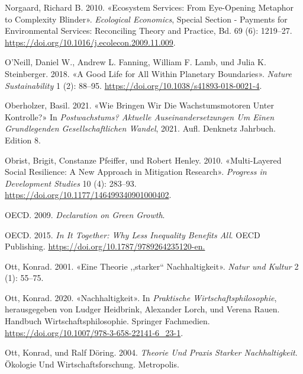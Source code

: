 \documentclass[
  nswissgerman,
  a4paper,
  DIV=11,
  numbers=noendperiod,
  oneside,
  openany]{scrreprt}
\newlength{\cslhangindent}
\newenvironment{CSLReferences}[2] %
 {\begin{list}{}{%
  \setlength{\itemindent}{0pt}
  \setlength{\leftmargin}{0pt}
  \setlength{\parsep}{0pt}
  \ifodd #1
   \setlength{\leftmargin}{\cslhangindent}
   \setlength{\itemindent}{-1\cslhangindent}
  \fi
  \setlength{\itemsep}{#2\baselineskip}}}
 {\end{list}}
\begin{document}
\begin{CSLReferences}{1}{1}
Norgaard, Richard B. 2010. {«Ecosystem Services: {From} Eye-Opening
Metaphor to Complexity Blinder»}. \emph{Ecological Economics}, Special
{Section} - {Payments} for {Environmental Services}: {Reconciling
Theory} and {Practice}, Bd. 69 (6): 1219--27.
\url{https://doi.org/10.1016/j.ecolecon.2009.11.009}.

O'Neill, Daniel W., Andrew L. Fanning, William F. Lamb, und Julia K.
Steinberger. 2018. {«A Good Life for All Within Planetary Boundaries»}.
\emph{Nature Sustainability} 1 (2): 88--95.
\url{https://doi.org/10.1038/s41893-018-0021-4}.

Oberholzer, Basil. 2021. {«Wie Bringen Wir Die {Wachstumsmotoren} Unter
{Kontrolle}?»} In \emph{Postwachstums? {Aktuelle Auseinandersetzungen}
Um Einen Grundlegenden Gesellschaftlichen {Wandel}}, 2021. Aufl.
Denknetz {Jahrbuch}. Edition 8.

Obrist, Brigit, Constanze Pfeiffer, und Robert Henley. 2010.
{«Multi-Layered Social Resilience: A New Approach in Mitigation
Research»}. \emph{Progress in Development Studies} 10 (4): 283--93.
\url{https://doi.org/10.1177/146499340901000402}.

OECD. 2009. \emph{Declaration on {Green Growth}}.

OECD. 2015. \emph{In {It Together}: {Why Less Inequality Benefits All}}.
OECD Publishing. \url{https://doi.org/10.1787/9789264235120-en.}

Ott, Konrad. 2001. {«Eine {Theorie} ,,starker`` {Nachhaltigkeit}»}.
\emph{Natur und Kultur} 2 (1): 55--75.

Ott, Konrad. 2020. {«{Nachhaltigkeit}»}. In \emph{{Praktische
Wirtschaftsphilosophie}}, herausgegeben von Ludger Heidbrink, Alexander
Lorch, und Verena Rauen. {Handbuch Wirtschaftsphilosophie}. Springer
Fachmedien. \url{https://doi.org/10.1007/978-3-658-22141-6_23-1}.

Ott, Konrad, und Ralf Döring. 2004. \emph{Theorie Und {Praxis} Starker
{Nachhaltigkeit}}. {Ö}kologie Und {Wirtschaftsforschung}. Metropolis.


\end{CSLReferences}
\end{document}
